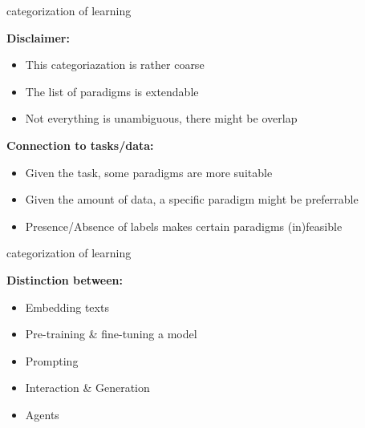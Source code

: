 \documentclass[11pt,compress,t,notes=noshow, xcolor=table]{beamer}
\begin{document}


\begin{vbframe}{categorization of learning}

\vfill

\textbf{Disclaimer:}

	\begin{itemize}
		\item This categoriazation is rather coarse
		\item The list of paradigms is extendable
		\item Not everything is unambiguous, there might be overlap
	\end{itemize}
	
\vspace{.3cm}

\textbf{Connection to tasks/data:}

	\begin{itemize}
		\item Given the task, some paradigms are more suitable
		\item Given the amount of data, a specific paradigm might be preferrable
		\item Presence/Absence of labels makes certain paradigms (in)feasible
	\end{itemize}

\vfill

\end{vbframe}


\begin{vbframe}{categorization of learning}

\vfill

\textbf{Distinction between:}

	\begin{itemize}
		\item Embedding texts
		\item Pre-training \& fine-tuning a model
		\item Prompting
		\item Interaction \& Generation
		\item Agents
	\end{itemize}

\vfill

\end{vbframe}
\end{document}
